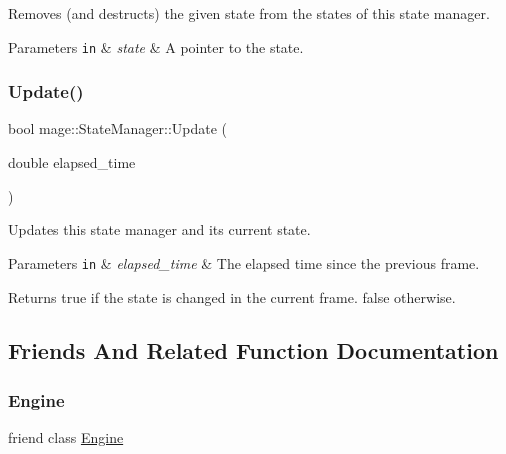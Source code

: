Removes (and destructs) the given state from the states of this state manager.


\begin{DoxyParams}[1]{Parameters}
\mbox{\tt in}  & {\em state} & A pointer to the state. \\
\hline
\end{DoxyParams}
\hypertarget{classmage_1_1_state_manager_a48498596d478d107621b1752104e02e3}{}\label{classmage_1_1_state_manager_a48498596d478d107621b1752104e02e3} 
\subsubsection{\texorpdfstring{Update()}{Update()}}
{\footnotesize\ttfamily bool mage\+::\+State\+Manager\+::\+Update (\begin{DoxyParamCaption}\item[{double}]{elapsed\+\_\+time }\end{DoxyParamCaption})\hspace{0.3cm}{\ttfamily [protected]}}

Updates this state manager and its current state.


\begin{DoxyParams}[1]{Parameters}
\mbox{\tt in}  & {\em elapsed\+\_\+time} & The elapsed time since the previous frame. \\
\hline
\end{DoxyParams}
\begin{DoxyReturn}{Returns}
{\ttfamily true} if the state is changed in the current frame. {\ttfamily false} otherwise. 
\end{DoxyReturn}


\subsection{Friends And Related Function Documentation}
\hypertarget{classmage_1_1_state_manager_a3e1914489e4bed4f9f23cdeab34a43dc}{}\label{classmage_1_1_state_manager_a3e1914489e4bed4f9f23cdeab34a43dc} 
\subsubsection{\texorpdfstring{Engine}{Engine}}
{\footnotesize\ttfamily friend class \hyperlink{classmage_1_1_engine}{Engine}\hspace{0.3cm}{\ttfamily [friend]}}



